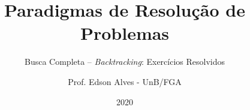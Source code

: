 \title{Paradigmas de Resolução de Problemas}
\subtitle{Busca Completa -- {\it Backtracking}: Exercícios Resolvidos}
\author{Prof. Edson Alves - UnB/FGA}
\date{2020}
